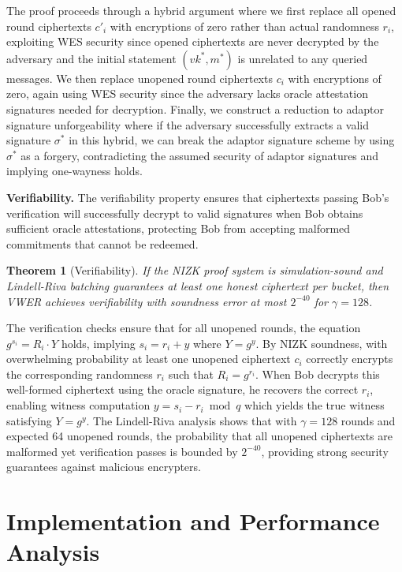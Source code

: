 \documentclass[11pt,a4paper]{article}
\newtheorem{theorem}{Theorem}[section]
\begin{document}
{The proof proceeds through a hybrid argument where we first replace all opened round ciphertexts $c'_i$ with encryptions of zero rather than actual randomness $r_i$, exploiting WES security since opened ciphertexts are never decrypted by the adversary and the initial statement $(vk^*, m^*)$ is unrelated to any queried messages. We then replace unopened round ciphertexts $c_i$ with encryptions of zero, again using WES security since the adversary lacks oracle attestation signatures needed for decryption. Finally, we construct a reduction to adaptor signature unforgeability where if the adversary successfully extracts a valid signature $\sigma^*$ in this hybrid, we can break the adaptor signature scheme by using $\sigma^*$ as a forgery, contradicting the assumed security of adaptor signatures and implying one-wayness holds.

\textbf{Verifiability.} The verifiability property ensures that ciphertexts passing Bob's verification will successfully decrypt to valid signatures when Bob obtains sufficient oracle attestations, protecting Bob from accepting malformed commitments that cannot be redeemed.

\begin{theorem}[Verifiability]
If the NIZK proof system is simulation-sound and Lindell-Riva batching guarantees at least one honest ciphertext per bucket, then VWER achieves verifiability with soundness error at most $2^{-40}$ for $\gamma = 128$.
\end{theorem}

The verification checks ensure that for all unopened rounds, the equation $g^{s_i} = R_i \cdot Y$ holds, implying $s_i = r_i + y$ where $Y = g^y$. By NIZK soundness, with overwhelming probability at least one unopened ciphertext $c_i$ correctly encrypts the corresponding randomness $r_i$ such that $R_i = g^{r_i}$. When Bob decrypts this well-formed ciphertext using the oracle signature, he recovers the correct $r_i$, enabling witness computation $y = s_i - r_i \bmod q$ which yields the true witness satisfying $Y = g^y$. The Lindell-Riva analysis shows that with $\gamma = 128$ rounds and expected 64 unopened rounds, the probability that all unopened ciphertexts are malformed yet verification passes is bounded by $2^{-40}$, providing strong security guarantees against malicious encrypters.

\section{Implementation and Performance Analysis}

}
\end{document}
